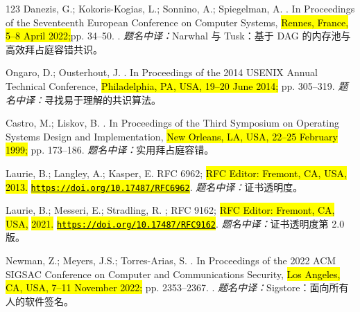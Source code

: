 \begin{thebibliography}{123}
Danezis, G.; Kokoris-Kogias, L.; Sonnino, A.; Spiegelman, A.
.
\newblock In Proceedings of the Seventeenth European Conference on Computer
  Systems, \hl{Rennes, France, 5--8 April 2022;}\linebreak   pp. 34--50.
.
\newblock \textit{题名中译：}Narwhal 与 Tusk：基于 DAG 的内存池与高效拜占庭容错共识。

Ongaro, D.; Ousterhout, J.
.
\newblock In Proceedings of the 2014 USENIX Annual Technical Conference, \hl{Philadelphia, PA, USA, 19--20 June 2014;}
  pp. 305--319.
\newblock \textit{题名中译：}寻找易于理解的共识算法。

Castro, M.; Liskov, B.
.
\newblock In Proceedings of the Third Symposium on Operating Systems Design and
  Implementation, \hl{New Orleans, LA, USA, 22--25 February  1999;} pp. 173--186.
\newblock \textit{题名中译：}实用拜占庭容错。

Laurie, B.; Langley, A.; Kasper, E.
 RFC 6962; \hl{RFC Editor: Fremont, CA, USA,} \hl{2013.} \newblock \href{https://doi.org/10.17487/RFC6962}{\hl{\mbox{\nolinkurl{https://doi.org/}}}}\allowbreak\href{https://doi.org/10.17487/RFC6962}{\hl{\mbox{\nolinkurl{10.17487/}}}}\allowbreak\href{https://doi.org/10.17487/RFC6962}{\hl{\mbox{\nolinkurl{RFC6962}}}}.
\newblock \textit{题名中译：}证书透明度。

Laurie, B.; Messeri, E.; Stradling, R.
; RFC 9162; \hl{RFC Editor: Fremont, CA, USA,} \hl{2021.} \newblock \href{https://doi.org/10.17487/RFC9162}{\hl{\mbox{\nolinkurl{https://doi.org/}}}}\allowbreak\href{https://doi.org/10.17487/RFC9162}{\hl{\mbox{\nolinkurl{10.17487/}}}}\allowbreak\href{https://doi.org/10.17487/RFC9162}{\hl{\mbox{\nolinkurl{RFC9162}}}}.
\newblock \textit{题名中译：}证书透明度第 2.0 版。

Newman, Z.; Meyers, J.S.; Torres-Arias, S.
.
\newblock In Proceedings of the 2022 ACM SIGSAC Conference on Computer and
  Communications Security, \hl{Los Angeles, CA, USA, 7--11 November  2022;} pp. 2353--2367.
.
\newblock \textit{题名中译：}Sigstore：面向所有人的软件签名。


\end{thebibliography}
